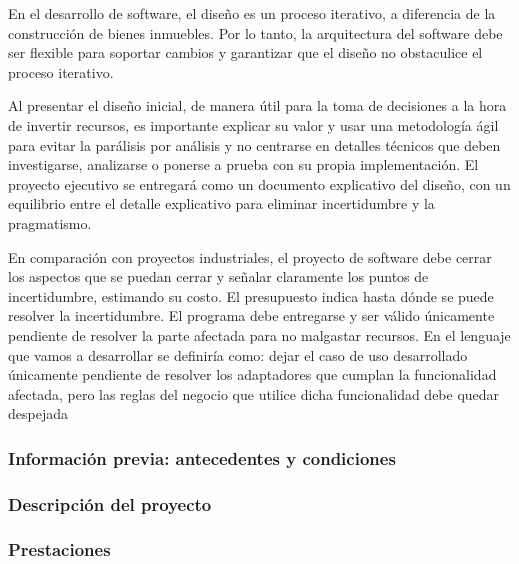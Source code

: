 En el desarrollo de software, el diseño es un proceso iterativo, a diferencia de la construcción de bienes inmuebles. Por lo tanto, la arquitectura del software debe ser flexible para soportar cambios y garantizar que el diseño no obstaculice el proceso iterativo.

Al presentar el diseño inicial, de manera útil para la toma de decisiones a la hora de invertir recursos, es importante explicar su valor y usar una metodología ágil para evitar la parálisis por análisis y no centrarse en detalles técnicos que deben investigarse, analizarse o ponerse a prueba con su propia implementación. El proyecto ejecutivo se entregará como un documento explicativo del diseño, con un equilibrio entre el detalle explicativo para eliminar incertidumbre y la pragmatismo.

En comparación con proyectos industriales, el proyecto de software debe cerrar los aspectos que se puedan cerrar y señalar claramente los puntos de incertidumbre, estimando su costo. El presupuesto indica hasta dónde se puede resolver la incertidumbre. El programa debe entregarse y ser válido únicamente pendiente de resolver la parte afectada para no malgastar recursos. En el lenguaje que vamos a desarrollar se definiría como: dejar el caso de uso desarrollado únicamente pendiente de resolver los adaptadores que cumplan la funcionalidad afectada, pero las reglas del negocio que utilice dicha funcionalidad debe quedar despejada

\subsubsection{Información previa: antecedentes y condiciones}
    
\subsubsection{Descripción del proyecto}
    
\subsubsection{Prestaciones}
    
